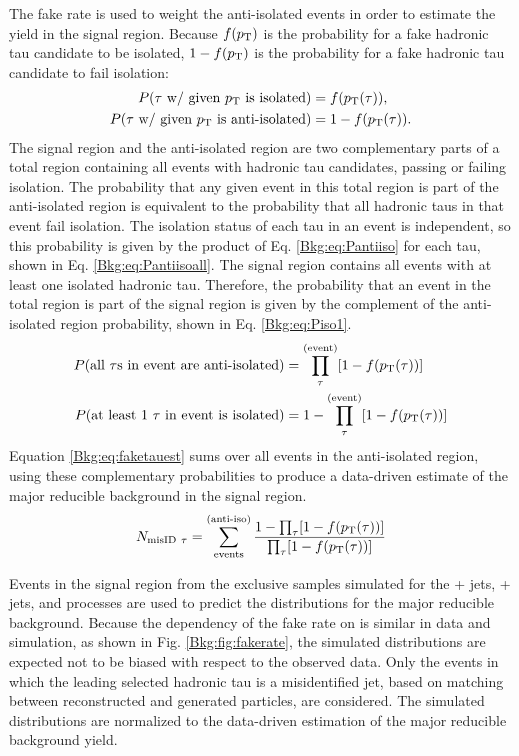 The fake rate is used to weight the anti-isolated events in order to estimate the yield in the signal region. Because $f(p_{\mathrm{T}})$ is the probability for a fake hadronic tau candidate to be isolated, $1-f(p_{\mathrm{T}})$ is the probability for a fake hadronic tau candidate to fail isolation:
\begin{align}
P(\tau\text{ w/ given \pt is isolated}) &= f(\pt(\tau)), \\
P(\tau\text{ w/ given \pt is anti-isolated}) &= 1 - f(\pt(\tau)). \label{Bkg:eq:Pantiiso}
\end{align}
The signal region and the anti-isolated region are two complementary parts of a total region containing all events with hadronic tau candidates, passing or failing isolation. The probability that any given event in this total region is part of the anti-isolated region is equivalent to the probability that all hadronic taus in that event fail isolation. The isolation status of each tau in an event is independent, so this probability is given by the product of Eq. \eqref{Bkg:eq:Pantiiso} for each tau, shown in Eq. \eqref{Bkg:eq:Pantiisoall}. The signal region contains all events with at least one isolated hadronic tau. Therefore, the probability that an event in the total region is part of the signal region is given by the complement of the anti-isolated region probability, shown in Eq. \eqref{Bkg:eq:Piso1}.
\begin{align}
P(\text{all }\tau\text{s in event are anti-isolated}) &= \prod_{\tau}^{\text{(event)}}[1-f(p_{\mathrm{T}}(\tau))] \label{Bkg:eq:Pantiisoall} \\
P(\text{at least 1 }\tau\text{ in event is isolated}) &= 1-\prod_{\tau}^{\text{(event)}}[1-f(p_{\mathrm{T}}(\tau))] \label{Bkg:eq:Piso1}
\end{align}
Equation \eqref{Bkg:eq:faketauest} sums over all events in the anti-isolated region, using these complementary probabilities to produce a data-driven estimate of the major reducible background in the signal region.
\begin{equation} N_{\text{misID}~\tau} = \sum_{\text{events}}^{\text{(anti-iso)}} \frac{1 - \prod_{\tau}[1-f(p_{\mathrm{T}}(\tau))]}{\prod_{\tau}[1-f(p_{\mathrm{T}}(\tau))]} \label{Bkg:eq:faketauest} \end{equation}

Events in the signal region from the exclusive samples simulated for the \W + jets, \Z + jets, and \ttbar processes are used to predict the \ST distributions for the major reducible background. Because the dependency of the fake rate on \pt is similar in data and simulation, as shown in Fig. \ref{Bkg:fig:fakerate}, the simulated distributions are expected not to be biased with respect to the observed data. Only the events in which the leading selected hadronic tau is a misidentified jet, based on matching between reconstructed and generated particles, are considered. The simulated distributions are normalized to the data-driven estimation of the major reducible background yield.

